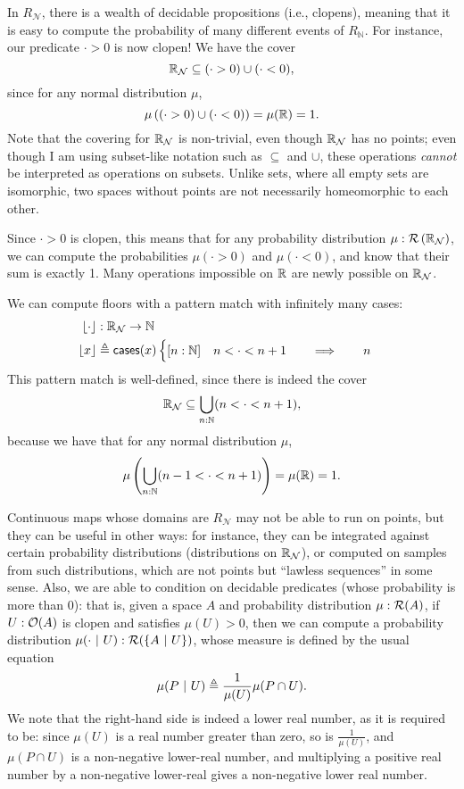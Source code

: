 In $R_\mathcal{N}$, there is a wealth of decidable propositions (i.e., clopens), meaning that it is easy to compute the probability of many different events of $R_\mathbb{N}$. For instance, our predicate $\cdot > 0$ is now clopen! We have the cover
\[
\mathbb{R}_{\mathcal{N}} \subseteq (\cdot > 0) \cup (\cdot < 0),
\]
since for any normal distribution $\mu$,
\[
\mu\left((\cdot > 0) \cup (\cdot < 0)\right) = \mu(\mathbb{R}) = 1.
\]
Note that the covering for $\mathbb{R}_\mathcal{N}$ is non-trivial, even though $\mathbb{R}_\mathcal{N}$ has no points; even though I am using subset-like notation such as $\subseteq$ and $\cup$, these operations \emph{cannot} be interpreted as operations on subsets. Unlike sets, where all empty sets are isomorphic, two spaces without points are not necessarily homeomorphic to each other.

Since $\cdot > 0$ is clopen, this means that for any probability distribution $\mu : \mathcal{R}\left(\mathbb{R}_\mathcal{N}\right)$, we can compute the probabilities $\mu(\cdot > 0)$ and $\mu(\cdot < 0)$, and know that their sum is exactly 1. Many operations impossible on $\mathbb{R}$ are newly possible on $\mathbb{R}_\mathcal{N}$. 

We can compute floors with a pattern match with infinitely many cases:
\begin{align*}
\lfloor \cdot \rfloor &: \mathbb{R}_\mathcal{N} \to \mathbb{N}
\\ \lfloor x \rfloor &\triangleq \mathsf{cases}(x)
\begin{cases}
[n : \mathbb{N}] \quad n < \cdot < n + 1
  \qquad \Longrightarrow \qquad
  n
\end{cases}
\end{align*}
This pattern match is well-defined, since there is indeed the cover
\[
\mathbb{R}_\mathcal{N} \subseteq \bigcup_{n : \mathbb{N}} (n < \cdot < n + 1),
\]
because we have that for any normal distribution $\mu$,
\[
\mu \left( \bigcup_{n : \mathbb{N}} (n - 1 < \cdot < n + 1) \right) = \mu(\mathbb{R}) = 1.
\]

Continuous maps whose domains are $R_\mathcal{N}$ may not be able to run on points, but they can be useful in other ways: for instance, they can be integrated against certain probability distributions (distributions on $\mathbb{R}_\mathcal{N}$), or computed on samples from such distributions, which are not points but ``lawless sequences'' in some sense. Also, we are able to condition on decidable predicates (whose probability is more than 0): that is, given a space $A$ and probability distribution $\mu : \mathcal{R}(A)$, if $U : \mathcal{O}({A})$ is clopen and satisfies $\mu(U) > 0$, then we can compute a probability distribution $\mu(\cdot \ |\  U) : \mathcal{R}(\{A \ |\  U \})$, whose measure is defined by the usual equation
\[
\mu(P \ |\  U) \triangleq \frac{1}{\mu(U)} \mu(P \cap U).
\]
We note that the right-hand side is indeed a lower real number, as it is required to be: since $\mu(U)$ is a real number greater than zero, so is $\frac{1}{\mu(U)}$, and $\mu(P \cap U)$ is a non-negative lower-real number, and multiplying a positive real number by a non-negative lower-real gives a non-negative lower real number.

